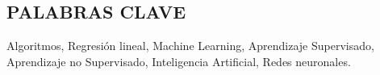 
\begin{center}
\section*{PALABRAS CLAVE}
\end{center}
Algoritmos, Regresi\'on lineal,  Machine Learning, Aprendizaje Supervisado, Aprendizaje no Supervisado, Inteligencia Artificial, Redes neuronales.
